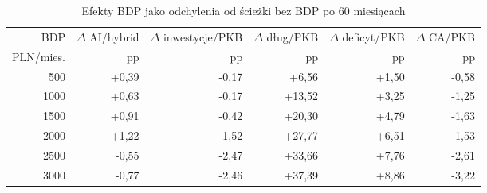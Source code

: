 \begin{table}[H]
\centering
\scriptsize
\caption{Efekty BDP jako odchylenia od ścieżki bez BDP po 60 miesiącach}
\label{tab:baseline-deltas}
\begin{tabular}{@{}rrrrrr@{}}
\toprule
BDP & \(\Delta\) AI/hybrid & \(\Delta\) inwestycje/PKB & \(\Delta\) dług/PKB & \(\Delta\) deficyt/PKB & \(\Delta\) CA/PKB \\
PLN/mies. & pp & pp & pp & pp & pp \\
\midrule
500  & +0,39 & -0,17 & +6,56  & +1,50 & -0,58 \\
1000 & +0,63 & -0,17 & +13,52 & +3,25 & -1,25 \\
1500 & +0,91 & -0,42 & +20,30 & +4,79 & -1,63 \\
2000 & +1,22 & -1,52 & +27,77 & +6,51 & -1,53 \\
2500 & -0,55 & -2,47 & +33,66 & +7,76 & -2,61 \\
3000 & -0,77 & -2,46 & +37,39 & +8,86 & -3,22 \\
\bottomrule
\end{tabular}
\end{table}
